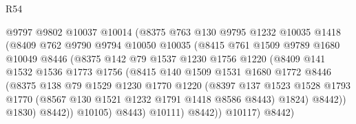 \begin{lexlean}{R54}
\begin{coremodule}
                        @9797
                        @9802
                        @10037
                        @10014
                        (@8375
                          @763
                          @130
                          @9795
                          @1232
                          @10035
                          @1418
                          (@8409
                            @762
                            @9790
                            @9794
                            @10050
                            @10035
                            (@8415
                              @761
                              @1509
                              @9789
                              @1680
                              @10049
                              @8446
                              (@8375
                                @142
                                @79
                                @1537
                                @1230
                                @1756
                                @1220
                                (@8409
                                  @141
                                  @1532
                                  @1536
                                  @1773
                                  @1756
                                  (@8415
                                    @140
                                    @1509
                                    @1531
                                    @1680
                                    @1772
                                    @8446
                                    (@8375
                                      @138
                                      @79
                                      @1529
                                      @1230
                                      @1770
                                      @1220
                                      (@8397
                                        @137
                                        @1523
                                        @1528
                                        @1793
                                        @1770
                                        (@8567 @130 @1521 @1232 @1791 @1418 @8586 @8443)
                                        @1824)
                                      @8442))
                                  @1830)
                                @8442))
                            @10105)
                          @8443)
                        @10111)
                      @8442))
                  @10117)
                @8442)

\end{coremodule}
\end{lexlean}
